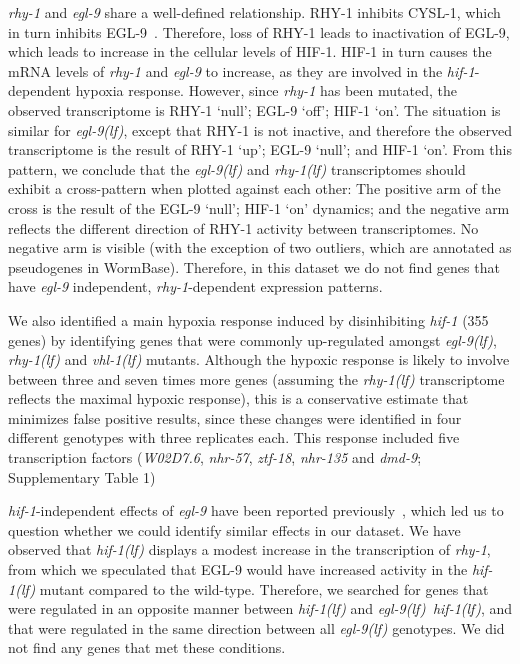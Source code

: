 \documentclass[10pt, onecolumn]{article}
\newcommand{\gene}[1]{\emph{#1}}
\newcommand{\nhr}{\emph{\mbox{nhr-57}}}
\newcommand{\egl}{\emph{\mbox{egl-9}(lf)}}
\newcommand{\rhy}{\emph{\mbox{rhy-1}(lf)}}
\newcommand{\vhl}{\emph{\mbox{vhl-1}(lf)}}
\newcommand{\eglhif}{\emph{\mbox{egl-9(lf)}~\mbox{hif-1(lf)}}}
\newcommand{\hif}{\emph{\mbox{hif-1(lf)}}}
\newcommand{\eglp}{EGL-9}
\newcommand{\rhyp}{RHY-1}
\newcommand{\hifp}{HIF-1}
\newcommand{\cyslp}{CYSL-1}
\begin{document}
\gene{rhy-1} and \gene{egl-9} share a well-defined relationship. \rhyp{}
inhibits \cyslp{},
which in turn inhibits \eglp{}~\cite{Ma2012}. Therefore, loss of \rhyp{} leads
to inactivation of \eglp{}, which leads to increase in the cellular levels of
\hifp{}. \hifp{} in turn causes the mRNA levels of \gene{rhy-1} and \gene{egl-9}
to increase,
as they are involved in the \gene{hif-1}-dependent hypoxia response. However, since
\gene{rhy-1} has been mutated, the observed transcriptome is
\rhyp{} `null'; \eglp{} `off'; \hifp{} `on'. The situation is similar for
\egl{}, except that \rhyp{}
is not inactive, and therefore the observed transcriptome is the result of
\rhyp{} `up'; \eglp{} `null'; and \hifp{} `on'. From this pattern, we conclude that
the \egl{} and \rhy{} transcriptomes should exhibit a cross-pattern when plotted
against each other: The positive
arm of the cross is the result of the \eglp{} `null'; \hifp{} `on' dynamics; and the
negative arm reflects the different direction of \rhyp{} activity between
transcriptomes. No negative arm is visible (with the exception of two
outliers, which are annotated as pseudogenes in WormBase). Therefore, in this
dataset we do not find genes that have \gene{egl-9} independent,
\gene{rhy-1}-dependent expression patterns.

We also identified a main hypoxia response induced by disinhibiting
\gene{hif-1} (355 genes) by identifying genes that were commonly up-regulated
amongst \egl{}, \rhy{} and \vhl{} mutants. Although the hypoxic response is likely
to involve between three and seven times more genes (assuming the \rhy{} transcriptome
reflects the maximal hypoxic response), this is a conservative
estimate that minimizes false positive results, since these changes were
identified in four different genotypes with three replicates each. This response
included five transcription factors (\gene{W02D7.6}, \nhr{}, \gene{ztf-18},
\gene{nhr-135} and \gene{dmd-9}; Supplementary Table 1)

\gene{hif-1}-independent effects of \gene{egl-9} have been reported
previously~\cite{Park2012}, which led us to question whether we could identify
similar effects in our dataset. We have observed that \hif{} displays a modest
increase in the transcription of \gene{rhy-1}, from which we speculated that
\eglp{} would have increased activity in the \hif{} mutant compared to the wild-type.
Therefore, we searched for genes that were regulated in an opposite manner between
\hif{} and \eglhif{}, and that were regulated in the same direction between
all \egl{} genotypes. We did not find any genes that met these conditions.
\end{document}
